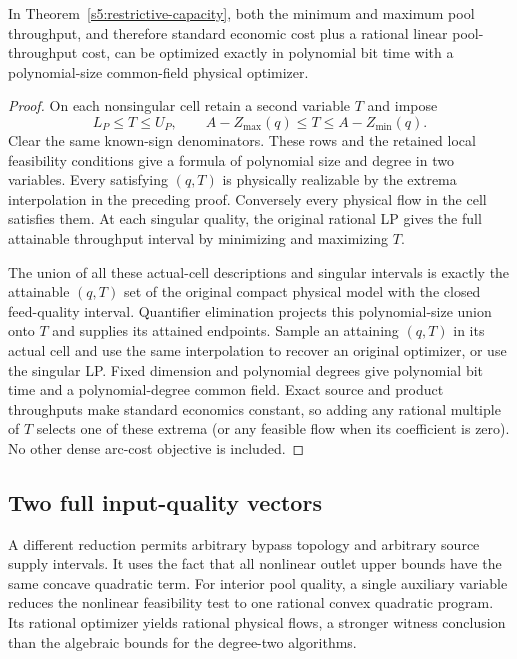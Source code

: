 \begin{corollary}
\label{s5:throughput-optimization}
In Theorem~\ref{s5:restrictive-capacity}, both the minimum and maximum
pool throughput, and therefore standard economic cost plus a rational
linear pool-throughput cost, can be optimized exactly in polynomial bit
time with a polynomial-size common-field physical optimizer.
\end{corollary}
\begin{proof}
On each nonsingular cell retain a second variable $T$ and impose
\[
 L_P\le T\le U_P,\qquad
 A-Z_{\max}(q)\le T\le A-Z_{\min}(q).
\]
Clear the same known-sign denominators. These rows and the retained
local feasibility conditions give a formula of polynomial size and
degree in two variables. Every satisfying $(q,T)$ is physically
realizable by the extrema interpolation in the preceding proof.
Conversely every physical flow in the cell satisfies them. At each
singular quality, the original rational LP gives the full attainable
throughput interval by minimizing and maximizing $T$.

The union of all these actual-cell descriptions and singular intervals
is exactly the attainable $(q,T)$ set of the original compact physical
model with the closed feed-quality interval. Quantifier elimination
projects this polynomial-size union onto $T$ and supplies its attained
endpoints. Sample an attaining $(q,T)$ in its actual cell and use the
same interpolation to recover an original optimizer, or use the
singular LP. Fixed dimension and polynomial degrees give polynomial bit
time and a polynomial-degree common field. Exact source and product
throughputs make standard economics constant, so adding any rational
multiple of $T$ selects one of these extrema (or any feasible flow when
its coefficient is zero). No other dense arc-cost objective is included.
\end{proof}

\subsection{Two full input-quality vectors}\label{s5:two-vectors}

A different reduction permits arbitrary bypass topology and arbitrary
source supply intervals. It uses the fact that all nonlinear outlet
upper bounds have the same concave quadratic term. For interior pool quality, a single
auxiliary variable reduces the nonlinear feasibility test to one rational
convex quadratic program. Its rational optimizer yields rational
physical flows, a stronger witness conclusion than the algebraic
bounds for the degree-two algorithms.

